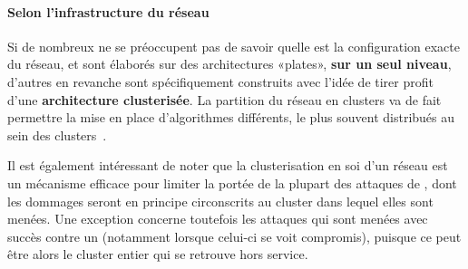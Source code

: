        \paragraph{Selon l'infrastructure du réseau}
Si de nombreux \IDS ne se préoccupent pas de savoir quelle est la configuration exacte du réseau, et sont élaborés sur des architectures «plates», \textbf{sur un seul niveau}, d'autres en revanche sont spécifiquement construits avec l'idée de tirer profit d'une \textbf{architecture clusterisée}.
La partition du réseau en clusters va de fait permettre la mise en place d'algorithmes différents, le plus souvent distribués au sein des clusters~\cite{SJ11}.

Il est également intéressant de noter que la clusterisation en soi d'un réseau est un mécanisme efficace pour limiter la portée de la plupart des attaques de \dds, dont les dommages seront en principe circonscrits au cluster dans lequel elles sont menées.
Une exception concerne toutefois les attaques qui sont menées avec succès contre un \ch (notamment lorsque celui-ci se voit compromis), puisque ce peut être alors le cluster entier qui se retrouve hors service.

